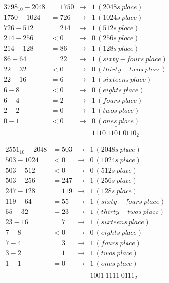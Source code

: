 \documentclass{article}
\begin{document}
\begin{align*}
3798_{10} - 2048    &= 1750 &\rightarrow& 1\ (2048s\ place) \\
1750 - 1024         &= 726  &\rightarrow& 1\ (1024s\ place) \\
726 - 512           &= 214  &\rightarrow& 1\ (512s\ place) \\
214 - 256           &< 0    &\rightarrow& 0\ (256s\ place) \\
214 - 128           &= 86   &\rightarrow& 1\ (128s\ place) \\
86 - 64             &= 22   &\rightarrow& 1\ (sixty-fours\ place) \\
22 - 32             &< 0    &\rightarrow& 0\ (thirty-twos\ place) \\
22 - 16             &= 6    &\rightarrow& 1\ (sixteens\ place) \\
6 - 8               &< 0    &\rightarrow& 0\ (eights\ place) \\
6 - 4               &= 2    &\rightarrow& 1\ (fours\ place) \\
2 - 2               &= 0    &\rightarrow& 1\ (twos\ place) \\
0 - 1               &< 0    &\rightarrow& \underline{0\ (ones\ place)} \\
                    &       &           & 1110\ 1101\ 0110_2
\end{align*}

\begin{align*}
2551_{10} - 2048    &= 503  &\rightarrow& 1\ (2048s\ place) \\
503 - 1024          &< 0    &\rightarrow& 0\ (1024s\ place) \\
503 - 512           &< 0    &\rightarrow& 0\ (512s\ place) \\
503 - 256           &= 247  &\rightarrow& 1\ (256s\ place) \\
247 - 128           &= 119  &\rightarrow& 1\ (128s\ place) \\
119 - 64            &= 55   &\rightarrow& 1\ (sixty-fours\ place) \\
55 - 32             &= 23   &\rightarrow& 1\ (thirty-twos\ place) \\
23 - 16             &= 7    &\rightarrow& 1\ (sixteens\ place) \\
7 - 8               &< 0    &\rightarrow& 0\ (eights\ place) \\
7 - 4               &= 3    &\rightarrow& 1\ (fours\ place) \\
3 - 2               &= 1    &\rightarrow& 1\ (twos\ place) \\
1 - 1               &= 0    &\rightarrow& \underline{1\ (ones\ place)} \\
                    &       &           & 1001\ 1111\ 0111_2
\end{align*}
\end{document}
